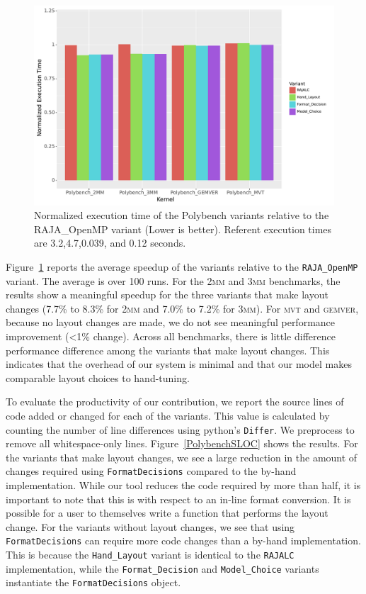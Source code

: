 \documentclass[sigconf]{acmart}
\begin{document}
\begin{figure}
	\includegraphics[width=\columnwidth]{PolybenchPerfPlot.pdf}
	\caption{Normalized execution time of the Polybench variants relative to the RAJA\_OpenMP variant (Lower is better). Referent execution times are 3.2,4.7,0.039, and 0.12 seconds.}
	\label{PolybenchPerformance}
\end{figure}

Figure~\ref{PolybenchPerformance} reports the average speedup of the variants relative to the \verb.RAJA_OpenMP. variant. 
The average is over 100 runs. 
For the \textsc{2mm} and \textsc{3mm} benchmarks, the results show a meaningful speedup for the three variants that make layout changes (7.7\% to 8.3\% for \textsc{2mm} and 7.0\% to 7.2\% for \textsc{3mm}).
For \textsc{mvt} and \textsc{gemver}, because no layout changes are made, we do not see meaningful performance improvement (<1\% change).
Across all benchmarks, there is little difference performance difference among the variants that make layout changes.
This indicates that the overhead of our system is minimal and that our model makes comparable layout choices to hand-tuning.

To evaluate the productivity of our contribution, we report the source lines of code added or changed for each of the variants.
This value is calculated by counting the number of line differences using python's \verb.Differ.. 
We preprocess to remove all whitespace-only lines.
Figure~\ref{PolybenchSLOC} shows the results.
For the variants that make layout changes, we see a large reduction in the amount of changes required using \verb.FormatDecisions. compared to the by-hand implementation. 
While our tool reduces the code required by more than half, it is important to note that this is with respect to an in-line format conversion.
It is possible for a user to themselves write a function that performs the layout change.
For the variants without layout changes, we see that using \verb.FormatDecisions. can require more code changes than a by-hand implementation. 
This is because the \verb.Hand_Layout. variant is identical to the \verb.RAJALC. implementation, while the \verb.Format_Decision. and \verb.Model_Choice. variants instantiate the \verb.FormatDecisions. object.
\end{document}
